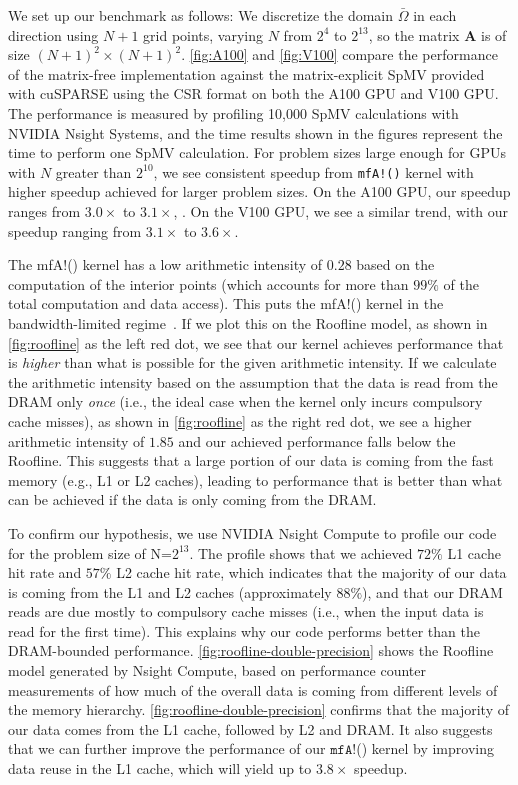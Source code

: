 We set up our benchmark as follows: We discretize the domain $\bar{\Omega}$ in each
direction using $N+1$ grid points, varying $N$ from $2^4$ to $2^{13}$, so the
matrix $\boldsymbol{A}$ is of size $(N+1)^2 \times (N+1)^2$. \autoref{fig:A100} and \autoref{fig:V100} compare the performance of the
matrix-free implementation against the matrix-explicit SpMV provided with
cuSPARSE using the CSR format on both the A100 GPU and V100 GPU.
The performance is measured by profiling 10,000 SpMV calculations with NVIDIA Nsight Systems, and the time results shown in the figures represent the time to perform one SpMV calculation.
For problem sizes large enough for GPUs with $N$ greater than $2^{10}$, we see consistent speedup from \texttt{mfA!()} kernel with higher speedup achieved for larger problem sizes. 
On the A100 GPU, our speedup ranges from $3.0\times$ to $3.1\times$, .
On the V100 GPU, we see a similar trend, with our speedup ranging from $3.1\times$ to $3.6\times$.

The {\ttfamily mfA!}() kernel has a low arithmetic intensity of $0.28$ based on the computation of the interior points (which accounts for more than $99\%$ of the total computation and data access).
This puts the {\ttfamily mfA!}() kernel in the bandwidth-limited regime~\citep{ding2019instruction}.
If we plot this on the Roofline model, as shown in \autoref{fig:roofline} as the left red dot, we see that our kernel achieves performance that is \emph{higher} than what is possible for the given arithmetic intensity.
If we calculate the arithmetic intensity based on the assumption that the data is read from the DRAM only \emph{once} (i.e., the ideal case when the kernel only incurs compulsory cache misses), as shown in \autoref{fig:roofline} as the right red dot, we see a higher arithmetic intensity of $1.85$ and our achieved performance falls below the Roofline.
This suggests that a large portion of our data is coming from the fast memory (e.g., L1 or L2 caches), leading to performance that is better than what can be achieved if the data is only coming from the DRAM.

To confirm our hypothesis, we use NVIDIA Nsight Compute to profile our code for the problem size of N=$2^{13}$.
The profile shows that we achieved $72\%$ L1 cache hit rate and $57\%$ L2 cache hit rate, which indicates that the majority of our data is coming from the L1 and L2 caches (approximately $88\%$), and that our DRAM reads are due mostly to compulsory cache misses (i.e., when the input data is read for the first time).
This explains why our code performs better than the DRAM-bounded performance.
\autoref{fig:roofline-double-precision} shows the Roofline model generated by Nsight Compute, based on performance counter measurements of how much of the overall data is coming from different levels of the memory hierarchy.
\autoref{fig:roofline-double-precision} confirms that the majority of our data comes from the L1 cache, followed by L2 and DRAM.
It also suggests that we can further improve the performance of our $\texttt{mfA!}$() kernel by improving data reuse in the L1 cache, which will yield up to $3.8\times$ speedup.


